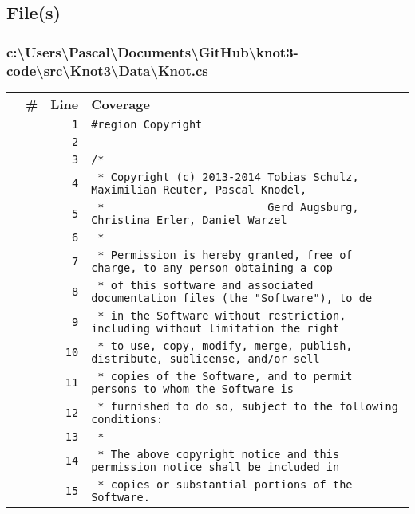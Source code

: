 \documentclass[a4paper,10pt]{article}
\begin{document}
\subsection{File(s)}
\subsubsection{c:\textbackslash Users\textbackslash Pascal\textbackslash Documents\textbackslash GitHub\textbackslash knot3-code\textbackslash src\textbackslash Knot3\textbackslash Data\textbackslash Knot.cs}
\begin{longtable}[l]{lrrl}
\textbf{} & \textbf{\#} & \textbf{Line} & \textbf{Coverage}\\
\cellcolor{gray} &  & \verb~1~ & \verb~#region Copyright~\\
\cellcolor{gray} &  & \verb~2~ & \verb~~\\
\cellcolor{gray} &  & \verb~3~ & \verb~/*~\\
\cellcolor{gray} &  & \verb~4~ & \verb~ * Copyright (c) 2013-2014 Tobias Schulz, Maximilian Reuter, Pascal Knodel,~\\
\cellcolor{gray} &  & \verb~5~ & \verb~ *                         Gerd Augsburg, Christina Erler, Daniel Warzel~\\
\cellcolor{gray} &  & \verb~6~ & \verb~ *~\\
\cellcolor{gray} &  & \verb~7~ & \verb~ * Permission is hereby granted, free of charge, to any person obtaining a cop~\\
\cellcolor{gray} &  & \verb~8~ & \verb~ * of this software and associated documentation files (the "Software"), to de~\\
\cellcolor{gray} &  & \verb~9~ & \verb~ * in the Software without restriction, including without limitation the right~\\
\cellcolor{gray} &  & \verb~10~ & \verb~ * to use, copy, modify, merge, publish, distribute, sublicense, and/or sell~\\
\cellcolor{gray} &  & \verb~11~ & \verb~ * copies of the Software, and to permit persons to whom the Software is~\\
\cellcolor{gray} &  & \verb~12~ & \verb~ * furnished to do so, subject to the following conditions:~\\
\cellcolor{gray} &  & \verb~13~ & \verb~ *~\\
\cellcolor{gray} &  & \verb~14~ & \verb~ * The above copyright notice and this permission notice shall be included in ~\\
\cellcolor{gray} &  & \verb~15~ & \verb~ * copies or substantial portions of the Software.~\\

\end{longtable}
\end{document}

